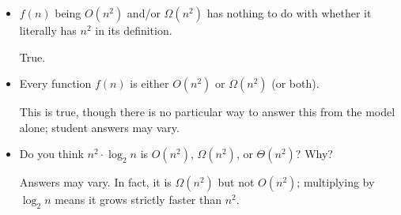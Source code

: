 \documentclass{tufte-handout}
\begin{document}
\begin{itemize}
\item $f(n)$ being $O(n^2)$ and/or $\Omega(n^2)$ has nothing to do
  with whether it literally has $n^2$ in its definition.
  \begin{answer} True. \end{answer}

\item Every function $f(n)$ is either $O(n^2)$ or $\Omega(n^2)$ (or
  both).
  \begin{answer}
    This is true, though there is no particular way to answer this
    from the model alone; student answers may vary.
  \end{answer}
\item Do you think $n^2 \cdot \log_2 n$ is $O(n^2)$, $\Omega(n^2)$, or
  $\Theta(n^2)$?  Why?
  \begin{answer}
    Answers may vary.  In fact, it is $\Omega(n^2)$ but not $O(n^2)$;
    multiplying by $\log_2 n$ means it grows strictly faster than
    $n^2$.
  \end{answer}
\end{itemize}
\end{document}
